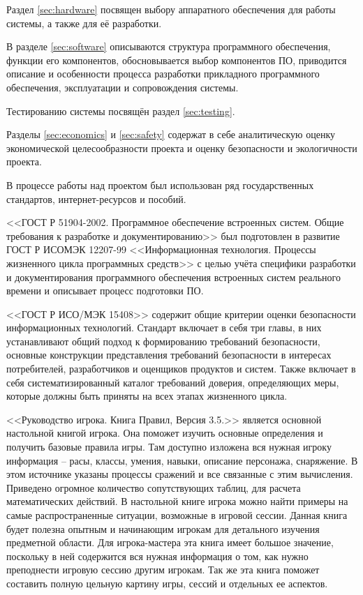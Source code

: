 Раздел \ref{sec:hardware} посвящен выбору аппаратного обеспечения для работы системы, а также для её разработки.

В разделе \ref{sec:software} описываются структура программного обеспечения, функции его компонентов, обосновывается выбор компонентов ПО, приводится описание и особенности процесса разработки прикладного программного обеспечения, эксплуатации и сопровождения системы.

Тестированию системы посвящён раздел \ref{sec:testing}.

Разделы \ref{sec:economics} и \ref{sec:safety} содержат в себе аналитическую оценку экономической целесообразности проекта и оценку безопасности и экологичности проекта.

В процессе работы над проектом был использован ряд государственных стандартов, интернет-ресурсов и пособий.

<<ГОСТ Р 51904-2002. Программное обеспечение встроенных систем. Общие требования к разработке и документированию>> был подготовлен в развитие ГОСТ Р ИСО\/МЭК 12207-99 <<Информационная технология. Процессы жизненного цикла программных средств>> с целью учёта специфики разработки и документирования программного обеспечения встроенных систем реального времени и описывает процесс подготовки ПО.

<<ГОСТ Р ИСО/МЭК 15408>> содержит общие критерии оценки безопасности информационных технологий. Стандарт включает в себя три главы, в них устанавливают общий подход к формированию требований безопасности, основные конструкции представления требований безопасности в интересах потребителей, разработчиков и оценщиков продуктов и систем. Также включает в себя систематизированный каталог требований доверия, определяющих меры, которые должны быть приняты на всех этапах жизненного цикла. 

<<Руководство игрока. Книга Правил, Версия 3.5.>> является основной настольной книгой игрока. Она поможет изучить основные определения и получить базовые правила игры. Там доступно изложена вся нужная игроку информация – расы, классы, умения, навыки, описание персонажа, снаряжение. В этом источнике указаны процессы сражений и все связанные с этим вычисления. Приведено огромное количество сопутствующих таблиц, для расчета математических действий. В настольной книге игрока можно найти примеры на самые распространенные ситуации, возможные в игровой сессии. Данная книга будет полезна опытным и начинающим игрокам для детального изучения предметной области. Для игрока-мастера эта книга имеет большое значение, поскольку в ней содержится вся нужная информация о том, как нужно преподнести игровую сессию другим игрокам. Так же эта книга поможет составить полную цельную картину игры, сессий и отдельных ее аспектов.

